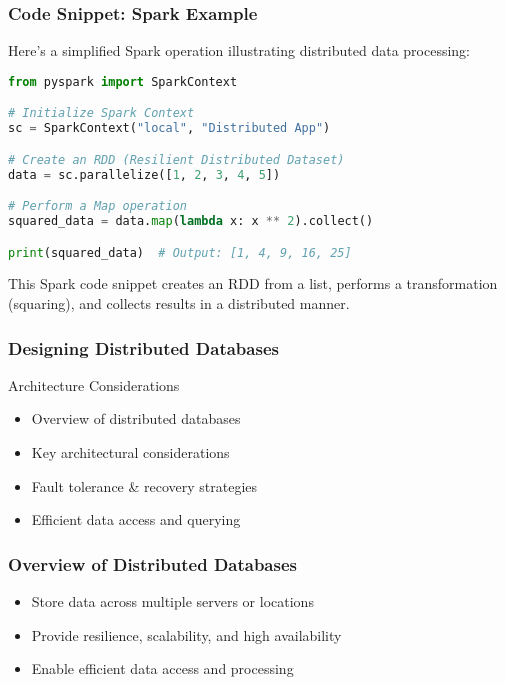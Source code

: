 \documentclass[aspectratio=169]{beamer}
\begin{document}
\begin{frame}[fragile]
  \frametitle{Code Snippet: Spark Example}
  Here's a simplified Spark operation illustrating distributed data processing:
  \begin{lstlisting}[language=Python]
from pyspark import SparkContext

# Initialize Spark Context
sc = SparkContext("local", "Distributed App")

# Create an RDD (Resilient Distributed Dataset)
data = sc.parallelize([1, 2, 3, 4, 5])

# Perform a Map operation
squared_data = data.map(lambda x: x ** 2).collect()

print(squared_data)  # Output: [1, 4, 9, 16, 25]
  \end{lstlisting}
  This Spark code snippet creates an RDD from a list, performs a transformation (squaring), and collects results in a distributed manner.
\end{frame}

\begin{frame}[fragile]
    \frametitle{Designing Distributed Databases}
    \begin{block}{Architecture Considerations}
        \begin{itemize}
            \item Overview of distributed databases
            \item Key architectural considerations
            \item Fault tolerance & recovery strategies
            \item Efficient data access and querying
        \end{itemize}
    \end{block}
\end{frame}

\begin{frame}[fragile]
    \frametitle{Overview of Distributed Databases}
    \begin{itemize}
        \item Store data across multiple servers or locations
        \item Provide resilience, scalability, and high availability
        \item Enable efficient data access and processing
    \end{itemize}
\end{frame}
\end{document}
